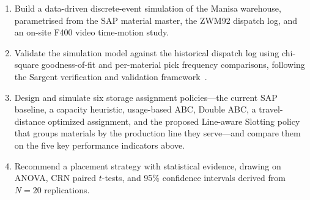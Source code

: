 \begin{enumerate}
  \item Build a data-driven discrete-event simulation of the Manisa
        warehouse, parametrised from the SAP material master, the ZWM92
        dispatch log, and an on-site F400 video time-motion study.
  \item Validate the simulation model against the historical dispatch log
        using chi-square goodness-of-fit and per-material pick frequency
        comparisons, following the Sargent verification and validation
        framework~\cite{sargent2013}.
  \item Design and simulate six storage assignment policies---the current
        SAP baseline, a capacity heuristic, usage-based ABC, Double
        ABC, a travel-distance optimized assignment, and the proposed
        Line-aware Slotting policy that groups materials by the production
        line they serve---and compare them on the five key performance
        indicators above.
  \item Recommend a placement strategy with statistical evidence, drawing
        on ANOVA, CRN paired $t$-tests, and 95\% confidence intervals
        derived from $N = 20$ replications.
\end{enumerate}
